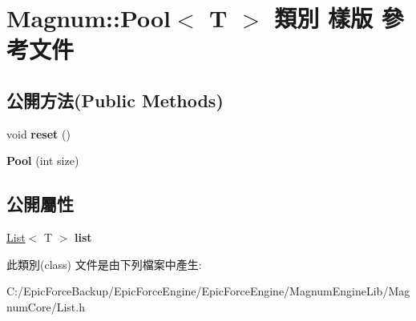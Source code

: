 \hypertarget{class_magnum_1_1_pool}{}\section{Magnum\+:\+:Pool$<$ T $>$ 類別 樣版 參考文件}
\label{class_magnum_1_1_pool}
\subsection*{公開方法(Public Methods)}
\begin{DoxyCompactItemize}
\item 
void {\bfseries reset} ()\hypertarget{class_magnum_1_1_pool_a575383aa5a2c44b552a497bc96b34181}{}\label{class_magnum_1_1_pool_a575383aa5a2c44b552a497bc96b34181}

\item 
{\bfseries Pool} (int size)\hypertarget{class_magnum_1_1_pool_a5f0c2bcf2e6c92287ccf3bea27e387d1}{}\label{class_magnum_1_1_pool_a5f0c2bcf2e6c92287ccf3bea27e387d1}

\end{DoxyCompactItemize}
\subsection*{公開屬性}
\begin{DoxyCompactItemize}
\item 
\hyperlink{class_magnum_1_1_list}{List}$<$ T $>$ {\bfseries list}\hypertarget{class_magnum_1_1_pool_ae7ef5545692686fd9fb1550ede1a7e75}{}\label{class_magnum_1_1_pool_ae7ef5545692686fd9fb1550ede1a7e75}

\end{DoxyCompactItemize}


此類別(class) 文件是由下列檔案中產生\+:\begin{DoxyCompactItemize}
\item 
C\+:/\+Epic\+Force\+Backup/\+Epic\+Force\+Engine/\+Epic\+Force\+Engine/\+Magnum\+Engine\+Lib/\+Magnum\+Core/List.\+h\end{DoxyCompactItemize}
